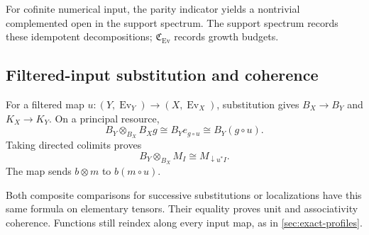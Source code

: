 \documentclass[11pt,a4paper]{article}
\numberwithin{algorithm}{section}
\numberwithin{equation}{section}
\theoremstyle{definition}
\theoremstyle{remark}
\theoremstyle{plain}
\newcommand{\Ev}{{\operatorname{Ev}}}
\newcommand{\Cplx}{\mathfrak C_{\Ev}}
\theoremstyle{definition}
\theoremstyle{plain}
\begin{document}
For cofinite numerical input, the parity indicator yields a
nontrivial complemented open in the support spectrum.  The support spectrum records these idempotent decompositions; $\Cplx$ records growth budgets.

\subsection{Filtered-input substitution and coherence}
\label{sec:input-substitution}
For a filtered map $u:(Y,\Ev_Y)\to(X,\Ev_X)$, substitution
gives $B_X\to B_Y$ and $K_X\to K_Y$.
On a principal resource,
\[
 B_Y\otimes_{B_X}B_Xg
 \cong B_Ye_{g\circ u}\cong B_Y(g\circ u).
\]
Taking directed colimits proves
\begin{equation}\label{eq:input-basechange}
 B_Y\otimes_{B_X}M_I\cong M_{\downarrow u^*I}.
\end{equation}
The map sends $b\otimes m$ to $b(m\circ u)$.

Both composite comparisons for successive substitutions or
localizations have this same formula on elementary tensors.
Their equality proves unit and associativity coherence.
Functions still reindex along every input map, as in
\cref{sec:exact-profiles}.
\end{document}
